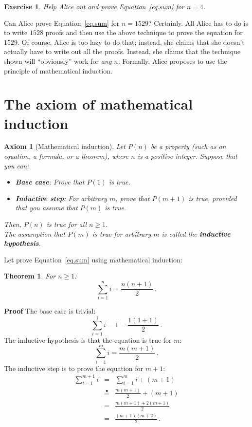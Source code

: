 \documentclass[11pt,a4paper]{report}
\newcommand*{\ih}{\stackrel{\bullet}{=}}
\newtheorem{theorem}{Theorem}
\newtheorem{axiom}{Axiom}
\newtheorem{exercise}{Exercise}
\begin{document}
\begin{exercise}
Help Alice out and prove Equation~\ref{eq.sum} for $n=4$.
\end{exercise}

Can Alice prove Equation~\ref{eq.sum} for $n=1529$? Certainly. All Alice has to do is to write $1528$ proofs and then use the above technique to prove the equation for $1529$. Of course, Alice is too lazy to do that; instead, she claims that she doesn't actually have to write out all the proofs. Instead, she claims that the technique shown will ``obviously'' work for \emph{any} $n$. Formally, Alice proposes to use the principle of mathematical induction.

\newpage

\section{The axiom of mathematical induction}

\begin{axiom}[Mathematical induction]\label{ax.induction} Let $P(n)$ be a property (such as an equation, a formula, or a theorem), where $n$ is a positive integer. Suppose that you can:
\begin{itemize}
\item \textbf{Base case}: Prove that $P(1)$ is true.
\item \textbf{Inductive step}: For arbitrary $m$, prove that $P(m+1)$ is true, provided that you assume that $P(m)$ is true.
\end{itemize}
Then, $P(n)$ is true for all $n\geq 1$.\\
The assumption that $P(m)$ is true for arbitrary $m$ is called the \textbf{inductive hypothesis}.
\end{axiom}

Let prove Equation~\ref{eq.sum} using mathematical induction:

\begin{theorem}\label{t.sum}
For $n\geq 1$:
\[
\sum_{i=1}^n i = \frac{n(n+1)}{2}\,.
\]
\end{theorem}

\textbf{Proof} The base case is trivial:
\[
\sum_{i=1}^1 i = 1 =\frac{1(1+1)}{2}\,.
\]
The inductive hypothesis is that the equation is true for $m$:
\[
\sum_{i=1}^{m} i = \frac{m(m+1)}{2}\,.
\]
The inductive step is to prove the equation for $m+1$:
\begin{eqnarray}
\sum_{i=1}^{m+1} i &=& \sum_{i=1}^m i + (m+1)\label{l.sum1}\\
&\ih{}&\frac{m(m+1)}{2} + (m+1)\label{l.sum2}\\
&=&\frac{m(m+1) + 2(m+1)}{2}\label{l.sum3}\\
&=&\frac{(m+1)(m+2)}{2}\,.\label{l.sum4}
\end{eqnarray}
\end{document}
